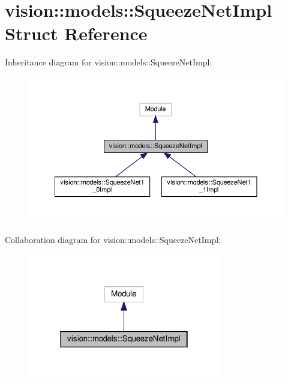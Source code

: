 \hypertarget{structvision_1_1models_1_1SqueezeNetImpl}{}\section{vision\+:\+:models\+:\+:Squeeze\+Net\+Impl Struct Reference}
\label{structvision_1_1models_1_1SqueezeNetImpl}


Inheritance diagram for vision\+:\+:models\+:\+:Squeeze\+Net\+Impl\+:
\nopagebreak
\begin{figure}[H]
\begin{center}
\leavevmode
\includegraphics[width=350pt]{structvision_1_1models_1_1SqueezeNetImpl__inherit__graph}
\end{center}
\end{figure}


Collaboration diagram for vision\+:\+:models\+:\+:Squeeze\+Net\+Impl\+:
\nopagebreak
\begin{figure}[H]
\begin{center}
\leavevmode
\includegraphics[width=238pt]{structvision_1_1models_1_1SqueezeNetImpl__coll__graph}
\end{center}
\end{figure}
